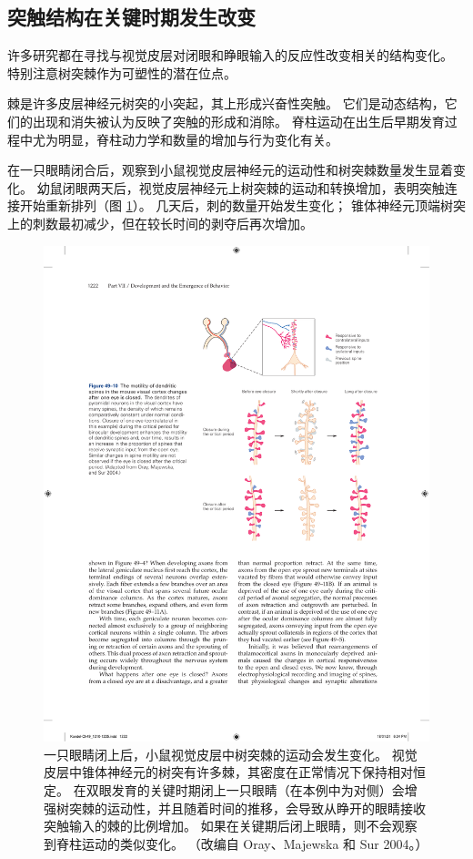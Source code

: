 \subsection{突触结构在关键时期发生改变}

许多研究都在寻找与视觉皮层对闭眼和睁眼输入的反应性改变相关的结构变化。
特别注意树突棘作为可塑性的潜在位点。


棘是许多皮层神经元树突的小突起，其上形成兴奋性突触。
它们是动态结构，它们的出现和消失被认为反映了突触的形成和消除。
脊柱运动在出生后早期发育过程中尤为明显，脊柱动力学和数量的增加与行为变化有关。


在一只眼睛闭合后，观察到小鼠视觉皮层神经元的运动性和树突棘数量发生显着变化。
幼鼠闭眼两天后，视觉皮层神经元上树突棘的运动和转换增加，表明突触连接开始重新排列（图 \ref{fig:49_10}）。
几天后，刺的数量开始发生变化；
锥体神经元顶端树突上的刺数最初减少，但在较长时间的剥夺后再次增加。


\begin{figure}[htbp]
	\centering
	\includegraphics[width=0.7\linewidth]{chap49/fig_49_10}
	\caption{一只眼睛闭上后，小鼠视觉皮层中树突棘的运动会发生变化。 视觉皮层中锥体神经元的树突有许多棘，其密度在正常情况下保持相对恒定。 在双眼发育的关键时期闭上一只眼睛（在本例中为对侧）会增强树突棘的运动性，并且随着时间的推移，会导致从睁开的眼睛接收突触输入的棘的比例增加。 如果在关键期后闭上眼睛，则不会观察到脊柱运动的类似变化。 （改编自 Oray、Majewska 和 Sur 2004。）}
	\label{fig:49_10}
\end{figure}


